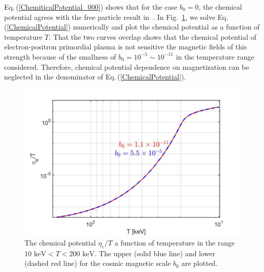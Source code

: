 \documentclass[universe,article,submit,moreauthors,pdftex,a4paper]{Definitions/mdpi}
\newcommand{\keV}{\text{ keV}}
\newcommand{\req}[1]{Eq.\,(\ref{#1})}
\newcommand*{\rf}[1]{Fig.~{\ref{#1}}}
\begin{document}
\req{ChemiticalPotential_000} shows that for the case $b_0=0$, the chemical potential agrees with the free particle result in~\cite{Chris:2023abc}.
In \rf{chemical_fig}, we solve \req{ChemicalPotential} numerically and plot the chemical potential as a function of temperature $T$. That the two curves overlap shows that the chemical potential of electron-positron primordial plasma is not sensitive the magnetic fields of this strength because of the smallness of $b_0=10^{-5}\sim10^{-11}$ in the temperature range considered. Therefore, chemical potential dependence on magnetization can be neglected in the denominator of \req{ChemicalPotential}. 

\begin{figure}[ht]
\centering
\includegraphics[width=\textwidth]{./plots/ChemicalPotentialFinal_200keV.jpg}
\caption{The chemical potential $\eta_{e}/T$ a function of temperature in the range $10\keV<T<200\keV$. The upper (solid blue line) and lower (dashed red line) for the cosmic magnetic scale $b_{0}$ are plotted.}
\label{chemical_fig} 
\end{figure}

\end{document}
